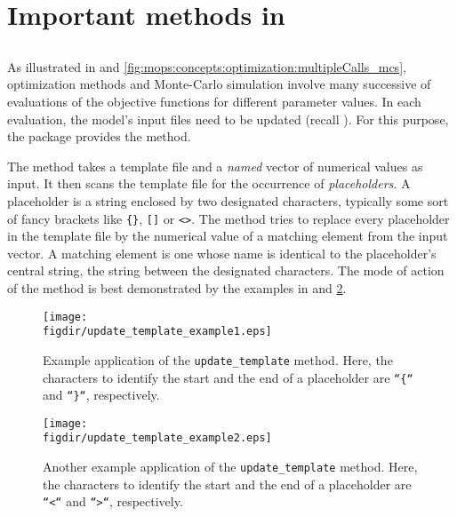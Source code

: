 \section{Important methods in } \label{sec:mops:methods}

\subsection{} \label{sec:mops:methods:update_template}

As illustrated in  and \ref{fig:mops:concepts:optimization:multipleCalls_mcs}, optimization methods and Monte-Carlo simulation involve many successive of evaluations of the objective functions for different parameter values. In each evaluation, the model's input files need to be updated (recall ). For this purpose, the  package provides the  method.

The method takes a template file and a \emph{named} vector of numerical values as input. It then scans the template file for the occurrence of \emph{placeholders}. A placeholder is a string enclosed by two designated characters, typically some sort of fancy brackets like \texttt{\{\}}, \texttt{[]} or \texttt{<>}. The  method tries to replace every placeholder in the template file by the numerical value of a matching element from the input vector. A matching element is one whose name is identical to the placeholder's central string, \ie{} the string between the designated characters. The mode of action of the  method is best demonstrated by the examples in  and \ref{fig:mops:methods:update_template_example2}.

\begin{figure}
  \centering
  \texttt{[image: \\figdir/update\_template\_example1.eps]}
  \caption[Example application of the \texttt{update\_template} method.]{Example application of the \texttt{update\_template} method. Here, the characters to identify the start and the end of a placeholder are \texttt{``\{``} and \texttt{``\}``}, respectively. \label{fig:mops:methods:update_template_example1}}
\end{figure}

\begin{figure}
  \centering
  \texttt{[image: \\figdir/update\_template\_example2.eps]}
  \caption[Another example application of the \texttt{update\_template} method.]{Another example application of the \texttt{update\_template} method. Here, the characters to identify the start and the end of a placeholder are \texttt{``<``} and \texttt{``>``}, respectively. \label{fig:mops:methods:update_template_example2}}
\end{figure}

